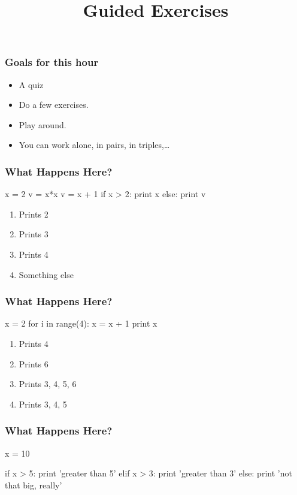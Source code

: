 
\title{Guided Exercises}

\frame{\maketitle}

\begin{frame}
\frametitle{Goals for this hour}

\begin{itemize}
\item A quiz
\item Do a few exercises.
\item Play around.
\item You can work alone, in pairs, in triples,\ldots
\end{itemize}

\end{frame}

\begin{frame}[fragile]
\frametitle{What Happens Here?}
\begin{python}
x = 2
v = x*x
v = x + 1
if x > 2:
    print x
else:
    print v
\end{python}

\begin{enumerate}
\item Prints \alert{2}
\item Prints \alert{3}
\item Prints \alert{4}
\item Something else
\end{enumerate}

\end{frame}

\begin{frame}[fragile]
\frametitle{What Happens Here?}
\begin{python}
x = 2
for i in range(4):
    x = x + 1
print x
\end{python}

\begin{enumerate}
\item Prints \alert{4}
\item Prints \alert{6}
\item Prints \alert{3}, \alert{4}, \alert{5}, \alert{6}
\item Prints \alert{3}, \alert{4}, \alert{5}
\end{enumerate}

\end{frame}

\begin{frame}[fragile]
\frametitle{What Happens Here?}

\begin{python}
x = 10

if x > 5:
    print 'greater than 5'
elif x > 3:
    print 'greater than 3'
else:
    print 'not that big, really'
\end{python}

\end{frame}

